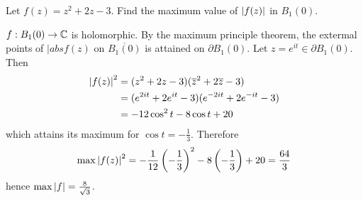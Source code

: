 \begin{example}
    Let $f(z) = z^2 + 2z - 3$. 
    Find the maximum value of $\left\lvert f(z)\right\rvert$ in $B_1(0)$.
\end{example}

\begin{solution}
    $f: B_1(0) \to \mathbb{C}$ is holomorphic.
    By the maximum principle theorem, the extermal points of
    $|abs{f(z)}$ on $\overline{B_1(0)}$ is attained on $\partial B_1(0)$.
    Let $z = e^{it} \in \partial B_1(0)$.
    Then
    \begin{align*}
        \left\lvert f(z)\right\rvert^2 
        &= (z^2 + 2z - 3)(\overline z^2 + 2\overline z - 3) \\
        &= (e^{2it} + 2e^{it} - 3)(e^{-2it} + 2e^{-it} - 3) \\
        &= -12\cos^2 t - 8\cos t + 20
    \end{align*}
    which attains its maximum for $\cos t = -\frac13$.
    Therefore
    \[
        \max{\left\lvert f(z)\right\rvert^2} = 
        -\frac1{12} \left(-\frac13\right)^2
        - 8\left(-\frac13\right)
        + 20
        = \frac{64}{3} 
    \]
    hence $\max\left\lvert f\right\rvert = \frac{8}{\sqrt 3}$. 
\end{solution}
